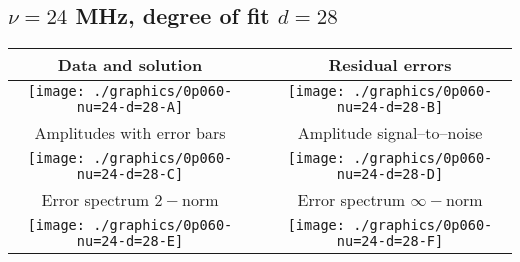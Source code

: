 

% 

\clearpage{}
\break{}

\subsection{$\nu = 24$ MHz, degree of fit $d = 28$}

\begin{table}[h]
    \begin{center}
        \begin{tabular}{ccc}
            Data and solution & \quad & Residual errors \\\hline
            \texttt{[image: ./graphics/0p060-nu=24-d=28-A]} &&
            \texttt{[image: ./graphics/0p060-nu=24-d=28-B]} \\[15pt]
            Amplitudes with error bars && Amplitude signal--to--noise \\\hline
            \texttt{[image: ./graphics/0p060-nu=24-d=28-C]} &&
            \texttt{[image: ./graphics/0p060-nu=24-d=28-D]} \\[15pt]
            Error spectrum $2-$norm && Error spectrum $\infty-$norm \\\hline
            \texttt{[image: ./graphics/0p060-nu=24-d=28-E]} &&
            \texttt{[image: ./graphics/0p060-nu=24-d=28-F]} \\[15pt]
        \end{tabular}
    \end{center}
\label{fig:elev=60, nu=24}
\end{table}



\endinput
